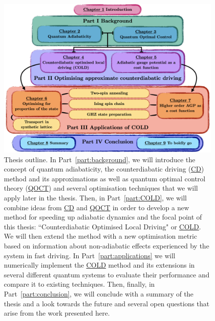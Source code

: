 \documentclass[a4paper,oneside,11pt]{book}
\newcommand{\acrref}[1]{\hyperref[acr:#1]{#1}}
\begin{document}
\begin{figure}[t!]
    \centering
    \includegraphics[width=\linewidth]{images/thesis_overview.png} \caption[Thesis outline.]{Thesis outline. In Part~\ref{part:background}, we will introduce the concept of quantum adiabaticity, the counterdiabatic driving (\acrref{CD}) method and its approximations as well as quantum optimal control theory (\acrref{QOCT}) and several optimisation techniques that we will apply later in the thesis. Then, in Part~\ref{part:COLD}, we will combine ideas from \acrref{CD} and \acrref{QOCT} in order to develop a new method for speeding up adiabatic dynamics and the focal point of this thesis: ``Counterdiabatic Optimised Local Driving" or \acrref{COLD}. We will then extend the method with a new optimisation metric based on information about non-adiabatic effects experienced by the system in fast driving. In Part~\ref{part:applications} we will numerically implement the \acrref{COLD} method and its extensions in several different quantum systems to evaluate their performance and compare it to existing techniques. Then, finally, in Part~\ref{part:conclusion}, we will conclude with a summary of the thesis and a look towards the future and several open questions that arise from the work presented here.}\label{fig:thesis_overview}
\end{figure}
\end{document}
